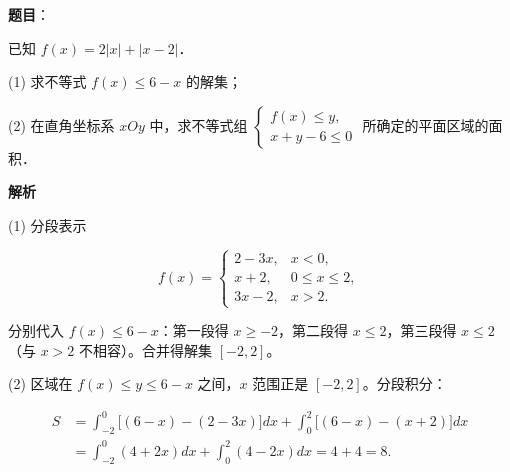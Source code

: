 \begin{answer}

\textbf{题目}：

已知 $f(x)=2|x|+|x-2|$．

(1) 求不等式 $f(x)\leqslant6-x$ 的解集；

(2) 在直角坐标系 $xOy$ 中，求不等式组 $\begin{cases}f(x)\leqslant y,\\x+y-6\leqslant0\end{cases}$ 所确定的平面区域的面积．

\textbf{解析}


(1) 分段表示

\nopagebreak[4]
\[
f(x)=\begin{cases}
2-3x,&x<0,\\
x+2,&0\leqslant x\leqslant2,\\
3x-2,&x>2.
\end{cases}
\]

分别代入 $f(x)\leqslant6-x$：第一段得 $x\geqslant-2$，第二段得 $x\leqslant2$，第三段得 $x\leqslant2$（与 $x>2$ 不相容）。合并得解集 $[-2,2]$。


(2) 区域在 $f(x)\leqslant y\leqslant6-x$ 之间，$x$ 范围正是 $[-2,2]$。分段积分：

\nopagebreak[4]
\[
\begin{aligned}
S&=\int_{-2}^0\bigl[(6-x)-(2-3x)\bigr]dx
+\int_0^2\bigl[(6-x)-(x+2)\bigr]dx\\
&=\int_{-2}^0(4+2x)dx+\int_0^2(4-2x)dx=4+4=8.
\end{aligned}
\]



\end{answer}
